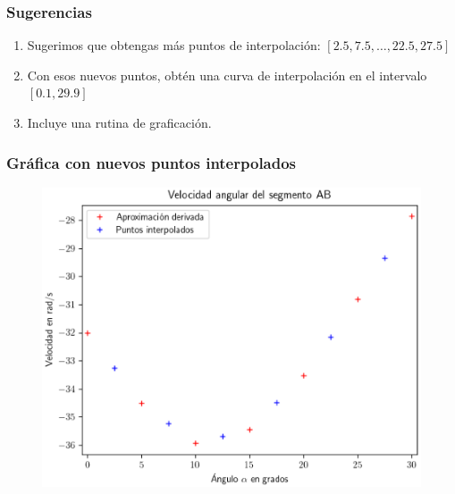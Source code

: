 \documentclass[12pt]{beamer}
\begin{document}
\begin{frame}
\frametitle{Sugerencias}
\begin{enumerate}[<+->]
\item Sugerimos que obtengas más puntos de interpolación: $[2.5, 7.5, \ldots, 22.5, 27.5]$
\item Con esos nuevos puntos, obtén una curva de interpolación en el intervalo $[0.1, 29.9]$
\item Incluye una rutina de graficación.
\end{enumerate}
\end{frame}
\begin{frame}
\frametitle{Gráfica con nuevos puntos interpolados}
\begin{figure}
    \centering
    \includegraphics[scale=0.55]{Imagenes/diferenciacion_ejercicio_segmento_02.eps}
\end{figure}
\end{frame}
\end{document}
